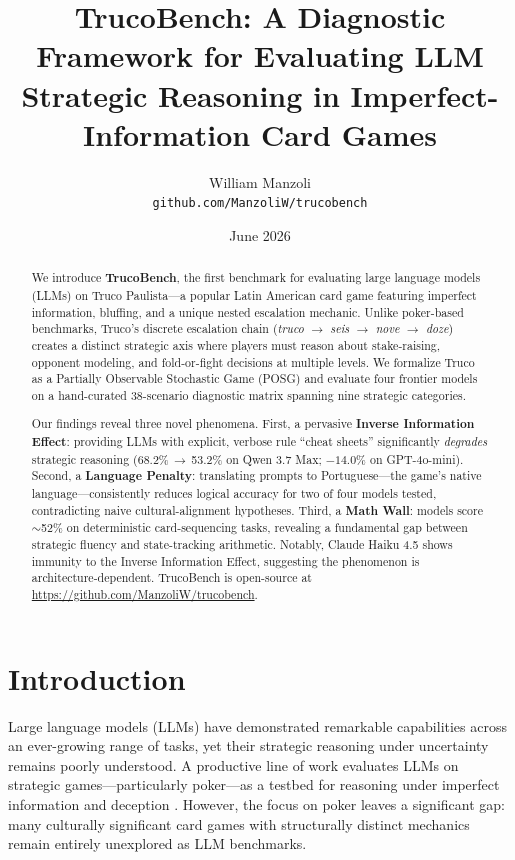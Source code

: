 \documentclass[11pt]{article}
\title{TrucoBench: A Diagnostic Framework for Evaluating LLM\\
Strategic Reasoning in Imperfect-Information Card Games}
\author{William Manzoli\\
  \texttt{github.com/ManzoliW/trucobench}}
\date{June 2026}
\begin{document}
\maketitle

\begin{abstract}
We introduce \textbf{TrucoBench}, the first benchmark for evaluating large language models (LLMs) on Truco Paulista---a popular Latin American card game featuring imperfect information, bluffing, and a unique nested escalation mechanic. Unlike poker-based benchmarks, Truco's discrete escalation chain (\textit{truco} $\to$ \textit{seis} $\to$ \textit{nove} $\to$ \textit{doze}) creates a distinct strategic axis where players must reason about stake-raising, opponent modeling, and fold-or-fight decisions at multiple levels. We formalize Truco as a Partially Observable Stochastic Game (POSG) and evaluate four frontier models on a hand-curated 38-scenario diagnostic matrix spanning nine strategic categories.

Our findings reveal three novel phenomena. First, a pervasive \textbf{Inverse Information Effect}: providing LLMs with explicit, verbose rule ``cheat sheets'' significantly \textit{degrades} strategic reasoning (68.2\%\,$\to$\,53.2\% on Qwen 3.7 Max; $-14.0$\% on GPT-4o-mini). Second, a \textbf{Language Penalty}: translating prompts to Portuguese---the game's native language---consistently reduces logical accuracy for two of four models tested, contradicting naive cultural-alignment hypotheses. Third, a \textbf{Math Wall}: models score $\sim$52\% on deterministic card-sequencing tasks, revealing a fundamental gap between strategic fluency and state-tracking arithmetic. Notably, Claude Haiku 4.5 shows immunity to the Inverse Information Effect, suggesting the phenomenon is architecture-dependent. TrucoBench is open-source at \url{https://github.com/ManzoliW/trucobench}.
\end{abstract}

\section{Introduction}

Large language models (LLMs) have demonstrated remarkable capabilities across an ever-growing range of tasks, yet their strategic reasoning under uncertainty remains poorly understood. A productive line of work evaluates LLMs on strategic games---particularly poker---as a testbed for reasoning under imperfect information and deception \cite{zhuang2025pokerbench,guo2023suspicion}. However, the focus on poker leaves a significant gap: many culturally significant card games with structurally distinct mechanics remain entirely unexplored as LLM benchmarks.
\end{document}
